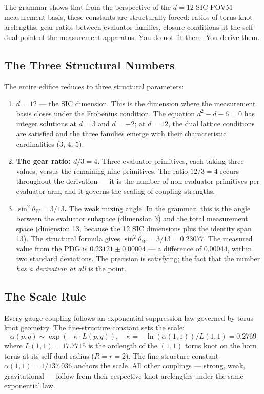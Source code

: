 \documentclass[11pt,a4paper,twocolumn]{article}
\begin{document}
The grammar shows that from the perspective of the $d=12$ SIC-POVM measurement basis, these constants are structurally forced: ratios of torus knot arclengths, gear ratios between evaluator families, closure conditions at the self-dual point of the measurement apparatus. You do not fit them. You derive them.

\subsection{The Three Structural Numbers}

The entire edifice reduces to three structural parameters:

\begin{enumerate}
\item \textbf{$d = 12$} — the SIC dimension. This is the dimension where the measurement basis closes under the Frobenius condition. The equation $d^2 - d - 6 = 0$ has integer solutions at $d = 3$ and $d = -2$; at $d = 12$, the dual lattice conditions are satisfied and the three families emerge with their characteristic cardinalities (3, 4, 5).

\item \textbf{The gear ratio: $d/3 = 4$.} Three evaluator primitives, each taking three values, versus the remaining nine primitives. The ratio $12/3 = 4$ recurs throughout the derivation — it is the number of non-evaluator primitives per evaluator arm, and it governs the scaling of coupling strengths.

\item \textbf{$\sin^2\theta_W = 3/13$.} The weak mixing angle. In the grammar, this is the angle between the evaluator subspace (dimension 3) and the total measurement space (dimension 13, because the 12 SIC dimensions plus the identity span 13). The structural formula gives $\sin^2\theta_W = 3/13 = 0.23077$. The measured value from the PDG is $0.23121 \pm 0.00004$ — a difference of $0.00044$, within two standard deviations. The precision is satisfying; the fact that the number \emph{has a derivation at all} is the point.
\end{enumerate}

\subsection{The Scale Rule}

Every gauge coupling follows an exponential suppression law governed by torus knot geometry. The fine-structure constant sets the scale:
\begin{equation}
\alpha(p,q) \sim \exp(-\kappa \cdot L(p,q)), \quad \kappa = -\ln(\alpha(1,1)) / L(1,1) = 0.2769
\end{equation}
where $L(1,1) = 17.7715$ is the arclength of the $(1,1)$ torus knot on the horn torus at its self-dual radius ($R = r = 2$). The fine-structure constant $\alpha(1,1) = 1/137.036$ anchors the scale. All other couplings — strong, weak, gravitational — follow from their respective knot arclengths under the same exponential law.
\end{document}

